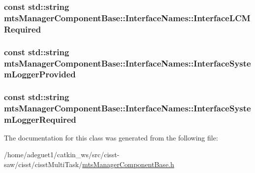 \hypertarget{classmts_manager_component_base_1_1_interface_names_a47bbe7357609b36bd957f461bcf79930}{
\subsubsection[{Interface\-L\-C\-M\-Required}]{\setlength{\rightskip}{0pt plus 5cm}const std\-::string mts\-Manager\-Component\-Base\-::\-Interface\-Names\-::\-Interface\-L\-C\-M\-Required\hspace{0.3cm}{\ttfamily [static]}}}\label{classmts_manager_component_base_1_1_interface_names_a47bbe7357609b36bd957f461bcf79930}
\hypertarget{classmts_manager_component_base_1_1_interface_names_ad5ed77aeed44addf0fbb46df6c621012}{
\subsubsection[{Interface\-System\-Logger\-Provided}]{\setlength{\rightskip}{0pt plus 5cm}const std\-::string mts\-Manager\-Component\-Base\-::\-Interface\-Names\-::\-Interface\-System\-Logger\-Provided\hspace{0.3cm}{\ttfamily [static]}}}\label{classmts_manager_component_base_1_1_interface_names_ad5ed77aeed44addf0fbb46df6c621012}
\hypertarget{classmts_manager_component_base_1_1_interface_names_ac9a7050301a0c9b7a3f91b8b5655d209}{
\subsubsection[{Interface\-System\-Logger\-Required}]{\setlength{\rightskip}{0pt plus 5cm}const std\-::string mts\-Manager\-Component\-Base\-::\-Interface\-Names\-::\-Interface\-System\-Logger\-Required\hspace{0.3cm}{\ttfamily [static]}}}\label{classmts_manager_component_base_1_1_interface_names_ac9a7050301a0c9b7a3f91b8b5655d209}


The documentation for this class was generated from the following file\-:\begin{DoxyCompactItemize}
\item 
/home/adeguet1/catkin\-\_\-ws/src/cisst-\/saw/cisst/cisst\-Multi\-Task/\hyperlink{mts_manager_component_base_8h}{mts\-Manager\-Component\-Base.\-h}\end{DoxyCompactItemize}
